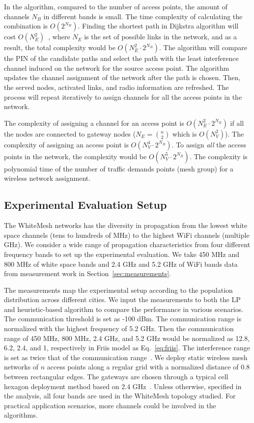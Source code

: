 In the algorithm, compared to the number of access points, the amount of channels $N_B$ in
different bands is small. The time complexity of calculating the combination is $O(2^{N_B})$. 
Finding the shortest path in Dijkstra algorithm will cost $O(N_E^2)$~\cite{golden1976shortest}, 
where $N_E$ is the set of possible links in the network, and as a result, the total complexity 
would be $O(N_E^2\cdot 2^{N_B})$. 
The algorithm will compare the PIN of the candidate paths and select the path with the 
least interference channel induced on the network for the source access point.
The algorithm updates the channel assignment of the network after the path is chosen.
Then, the served nodes, activated links, and radio information are refreshed. 
The process will repeat iteratively to assign channels for all the access points in the
network.

The complexity of assigning a channel for an access point is $O(N_E^2\cdot2^{N_B})$ 
if all the nodes are connected to gateway nodes ($N_E={n \choose 2}$ which is $O(N_V^2)$). 
The complexity of assigning an access point is $O(N_V^4\cdot2^{N_B})$.
To assign {\it all} the access points in the network, the complexity would be 
$O(N_V^5\cdot2^{N_B})$. The complexity is polynomial time of the number of traffic 
demands points (mesh group) for a wireless network assignment.


\subsection{Experimental Evaluation Setup}
\label{subsec:design}
The WhiteMesh networks has the diversity in propagation from the lowest white space channels 
(tens to hundreds of MHz) to the highest WiFi channels (multiple GHz). We consider a wide range 
of propagation characteristics from four different frequency bands to set up the experimental 
evaluation. We take 450 MHz and 800 MHz of white space bands and 2.4 GHz and 5.2 GHz of WiFi bands
data from measurement work in Section~\ref{sec:measurements}.

The measurements map the experimental setup according to the population distribution across 
different cities. We input the measurements to both the LP and heuristic-based algorithm to compare 
the performance in various scenarios. The communication threshold is set as -100 dBm. The 
communication range is normalized with the highest frequency of 5.2 GHz. Then the communication 
range of 450 MHz, 800 MHz, 2.4 GHz, and 5.2 GHz would be normalized as 12.8, 6.2, 2.4, and 1, 
respectively in Friis model as Eq.~\ref{eq:friis}. 
The interference range is set as twice that of the communication range~\cite{raniwala2005architecture}. 
We deploy static wireless mesh networks of $n$ access points along a regular grid with a normalized 
distance of 0.8 between rectangular edges. The gateways are chosen through a typical cell hexagon 
deployment method based on 2.4 GHz~\cite{meguerdichian2001exposure}. Unless otherwise, specified 
in the analysis, all four bands are used in the WhiteMesh topology studied. For practical application 
scenarios, more channels could be involved in the algorithms.


